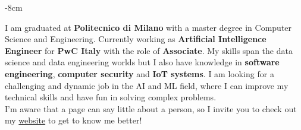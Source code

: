 \documentclass[10pt,a4paper]{altacv}
\begin{document}






\begin{adjustwidth}{}{-8cm}
\makecvheader
\end{adjustwidth}

I am graduated at \textbf{Politecnico di Milano} with a master degree in Computer Science and Engineering.
Currently working as \textbf{Artificial Intelligence Engineer} for \textbf{PwC Italy} with the role of \textbf{Associate}.
My skills span the data science and data engineering worlds but I also have knowledge in \textbf{software engineering}, \textbf{computer security} and \textbf{IoT systems}.
I am looking for a challenging and dynamic job in the AI and ML field, where I can improve my technical skills and have fun in solving complex problems. \\I'm aware that a page can say little about a person, so I invite you to check out my \href{https://mmarini.it}{website} to get to know me better!
\end{document}
